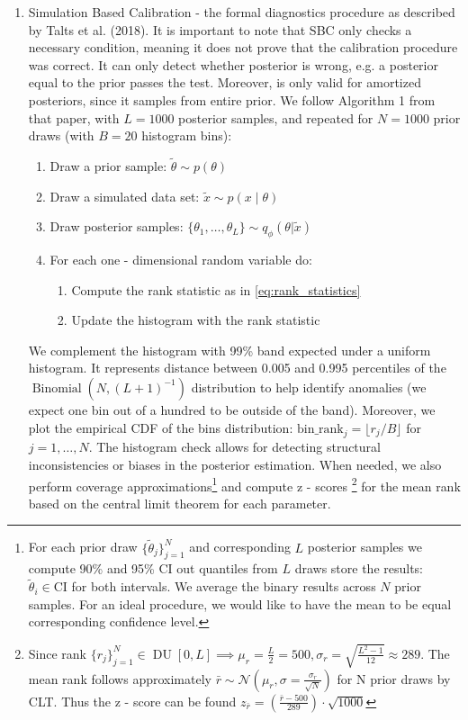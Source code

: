 \documentclass[12pt]{article}
\begin{document}
\begin{enumerate}
    \item Simulation Based Calibration - the formal diagnostics procedure as described by Talts et al. (2018). It is important to note that SBC only checks a necessary condition, meaning it does not prove that the calibration procedure was correct. It can only detect whether posterior is wrong, e.g. a posterior equal to the prior passes the test. Moreover, is only valid for amortized posteriors, since it samples from entire prior. We follow Algorithm 1 from that paper, with $L = 1000$ posterior samples, and repeated for $N = 1000$ prior draws (with $B = 20$ histogram bins):
    \begin{enumerate}
        \item [i. ] Draw a prior sample: $\tilde{{\theta}} \sim p(\theta)$
        \item [ii. ] Draw a simulated data set: $\tilde{x} \sim p(x \mid \theta)$ 
        \item [iii. ] Draw posterior samples: $\{ \theta_1, \dots , \theta_L \} \sim q_\phi(\theta | \tilde{x})$
        \item [iv. ] For each one - dimensional random variable do:
        \begin{enumerate}
            \item Compute the rank statistic as in \eqref{eq:rank_statistics} 
            \item Update the histogram with the rank statistic
        \end{enumerate}
    \end{enumerate}
    We complement the histogram with 99\% band expected under a uniform histogram. It represents distance between 0.005 and 0.995 percentiles of the $\operatorname{Binomial}(N, (L + 1)^{-1})$ distribution to help identify anomalies (we expect one bin out of a hundred to be outside of the band). Moreover, we plot the empirical CDF of the bins distribution: $\text{bin\_rank}_j = \lfloor r_j / B \rfloor $ for $j = 1, \dots, N$. The histogram check allows for detecting structural inconsistencies or biases in the posterior estimation. When needed, we also perform coverage approximations\footnote{For each prior draw $\{\tilde{\theta}_j\}_{j = 1}^N$ and corresponding $L$ posterior samples we compute 90\% and 95\% CI out quantiles from $L$ draws store the results: $\tilde{\theta}_i \in \text{CI}$ for both intervals. We average the binary results across $N$ prior samples. For an ideal procedure, we would like to have the mean to be equal corresponding confidence level.} and compute z - scores \footnote{Since rank $\{r_j\}_{j = 1}^N \in \operatorname{DU}[0, L] \implies \mu_r = \frac{L}{2} = 500, \sigma_r = \sqrt{\frac{L^2  - 1}{12}} \approx 289$. The mean rank follows approximately $\bar{r} \sim \mathcal{N}(\mu_r, \sigma = \frac{\sigma_r}{\sqrt{N}})$ for N prior draws by CLT. Thus the z - score can be found $z_{\bar{r}} = \left(\frac{\bar{r} - 500}{289}\right) \cdot \sqrt{1000}$ } for the mean rank based on the central limit theorem for each parameter.
    

\end{enumerate}
\end{document}
